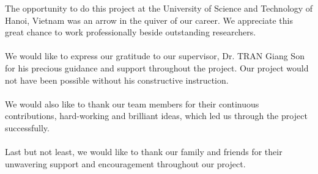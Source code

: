 \noindent The opportunity to do this project at
the University of Science and Technology of Hanoi, Vietnam
was an arrow in the quiver of our career. We appreciate
this great chance to work professionally beside outstanding researchers.\\
\\

We would like to express our gratitude to our 
supervisor, Dr. TRAN Giang Son for his precious 
guidance and support throughout the project. Our
project would not have been possible without his
constructive instruction. \\
\\

We would also like to thank our team members for 
their continuous contributions, hard-working and brilliant ideas, 
which led us through the project successfully.\\
\\

Last but not least, we would like to thank our family 
and friends for their unwavering support and encouragement
throughout our project.

